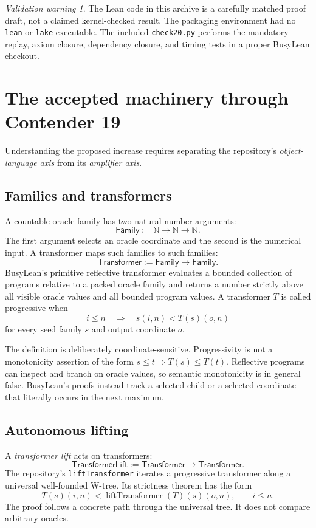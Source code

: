 \documentclass[11pt]{article}
\theoremstyle{definition}
\theoremstyle{remark}
\newtheorem{warning}[theorem]{Validation warning}
\newcommand{\N}{\mathbb{N}}
\newcommand{\Family}{\mathsf{Family}}
\newcommand{\Transformer}{\mathsf{Transformer}}
\newcommand{\TLift}{\mathsf{TransformerLift}}
\newcommand{\leanname}[1]{\nolinkurl{#1}}
\newcommand{\code}[1]{\texttt{#1}}
\begin{document}
\begin{warning}
The Lean code in this archive is a carefully matched proof draft, not a claimed
kernel-checked result.  The packaging environment had no \code{lean} or
\code{lake} executable.  The included \leanname{check20.py} performs the
mandatory replay, axiom closure, dependency closure, and timing tests in a
proper BusyLean checkout.
\end{warning}

\section{The accepted machinery through Contender 19}

Understanding the proposed increase requires separating the repository's
\emph{object-language axis} from its \emph{amplifier axis}.

\subsection{Families and transformers}

A countable oracle family has two natural-number arguments:
\[
  \Family := \N \to \N \to \N.
\]
The first argument selects an oracle coordinate and the second is the numerical
input.  A transformer maps such families to such families:
\[
  \Transformer := \Family \to \Family.
\]
BusyLean's primitive reflective transformer evaluates a bounded collection of
programs relative to a packed oracle family and returns a number strictly above
all visible oracle values and all bounded program values.  A transformer
$T$ is called progressive when
\[
  i\le n \quad\Longrightarrow\quad
  s(i,n)<T(s)(o,n)
\]
for every seed family $s$ and output coordinate $o$.

The definition is deliberately coordinate-sensitive.  Progressivity is not a
monotonicity assertion of the form $s\le t\Rightarrow T(s)\le T(t)$.  Reflective
programs can inspect and branch on oracle values, so semantic monotonicity is in
general false.  BusyLean's proofs instead track a selected child or a selected
coordinate that literally occurs in the next maximum.

\subsection{Autonomous lifting}

A \emph{transformer lift} acts on transformers:
\[
  \TLift := \Transformer \to \Transformer.
\]
The repository's \leanname{liftTransformer} iterates a progressive transformer
along a universal well-founded W-tree.  Its strictness theorem has the form
\[
  T(s)(i,n)<\operatorname{liftTransformer}(T)(s)(o,n),
  \qquad i\le n.
\]
The proof follows a concrete path through the universal tree.  It does not
compare arbitrary oracles.
\end{document}
